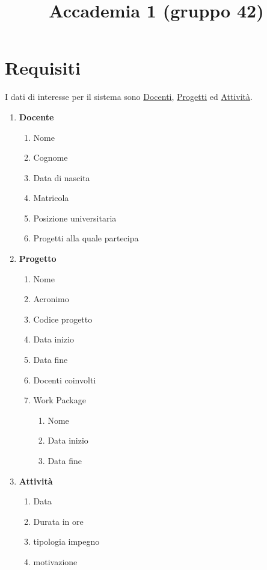 \documentclass[12pt, letterpaper]{article}
\title{Accademia 1 (gruppo 42)}
\date{}
\begin{document}
\maketitle


\section{Requisiti}

I dati di interesse per il sistema sono \underline{Docenti}, \underline{Progetti} ed \underline{Attività}.
\begin{enumerate}
    \item \textbf{Docente}\begin{enumerate}
        \item Nome 
        \item Cognome 
        \item Data di nascita 
        \item Matricola 
        \item Posizione universitaria
        \item Progetti alla quale partecipa
    \end{enumerate}
    \item \textbf{Progetto}\begin{enumerate}
        \item Nome 
        \item Acronimo 
        \item Codice progetto
        \item Data inizio 
        \item Data fine 
        \item Docenti coinvolti
        \item Work Package\begin{enumerate}
            \item Nome 
            \item Data inizio 
            \item Data fine
        \end{enumerate}
    \end{enumerate}
    \item\textbf{Attività}\begin{enumerate}
        \item Data 
        \item Durata in ore 
        \item tipologia impegno 
        \item motivazione
    \end{enumerate}
\end{enumerate}
\end{document}
